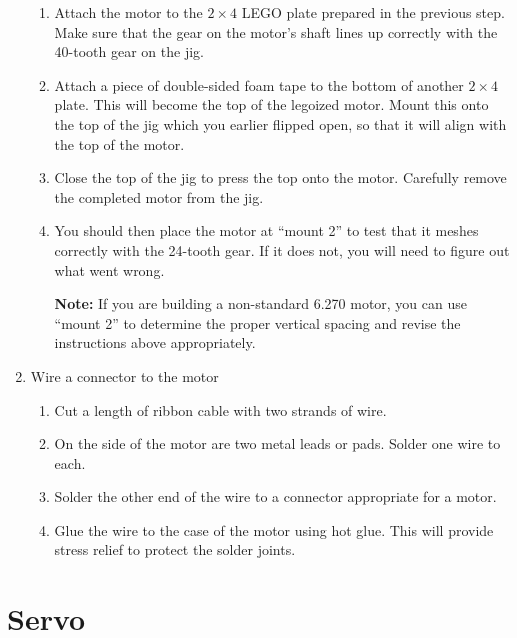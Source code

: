 \begin{enumerate}
\begin{enumerate}
 \item Attach the motor to the $2\times4$ LEGO plate prepared in the previous
 step. Make sure that the gear on the motor's shaft lines up correctly
 with the 40-tooth gear on the jig.

 \item Attach a piece of double-sided foam tape to the bottom of
 another $2\times4$ plate. This will become the top of the legoized
 motor. Mount this onto the top of the jig which you earlier flipped
 open, so that it will align with the top of the motor.

 \item Close the top of the jig to press the top onto the
 motor. Carefully remove the completed motor from the jig.

 \item You should then place the motor at ``mount 2'' to test that it
 meshes correctly with the 24-tooth gear. If it does not, you will
 need to figure out what went wrong.

 {\bf Note:} If you are building a non-standard 6.270 motor, you can
 use ``mount 2'' to determine the proper vertical spacing and revise
 the instructions above appropriately.

\end{enumerate}

 \item Wire a connector to the motor

\begin{enumerate}

 \item Cut a length of ribbon cable with two strands of wire.

 \item On the side of the motor are two metal leads or pads. Solder
 one wire to each.

 \item Solder the other end of the wire to a connector appropriate for
 a motor.

 \item Glue the wire to the case of the motor using hot glue. This
 will provide stress relief to protect the solder joints.

\end{enumerate}

\end{enumerate}


\section{Servo}

